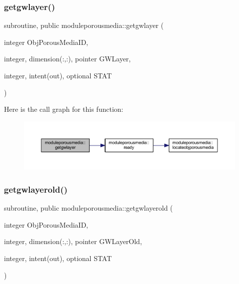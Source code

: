 \subsubsection{\texorpdfstring{getgwlayer()}{getgwlayer()}}
{\footnotesize\ttfamily subroutine, public moduleporousmedia\+::getgwlayer (\begin{DoxyParamCaption}\item[{integer}]{Obj\+Porous\+Media\+ID,  }\item[{integer, dimension(\+:,\+:), pointer}]{G\+W\+Layer,  }\item[{integer, intent(out), optional}]{S\+T\+AT }\end{DoxyParamCaption})}

Here is the call graph for this function\+:\nopagebreak
\begin{figure}[H]
\begin{center}
\leavevmode
\includegraphics[width=350pt]{namespacemoduleporousmedia_a48f51dadcb6b3234ad3625d8e26cb7bc_cgraph}
\end{center}
\end{figure}
\mbox{\label{namespacemoduleporousmedia_aa697c2ff7c0b471220e55d71bd4c665a}} 
\subsubsection{\texorpdfstring{getgwlayerold()}{getgwlayerold()}}
{\footnotesize\ttfamily subroutine, public moduleporousmedia\+::getgwlayerold (\begin{DoxyParamCaption}\item[{integer}]{Obj\+Porous\+Media\+ID,  }\item[{integer, dimension(\+:,\+:), pointer}]{G\+W\+Layer\+Old,  }\item[{integer, intent(out), optional}]{S\+T\+AT }\end{DoxyParamCaption})}

